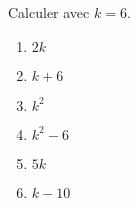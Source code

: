 
\begin{exercice}\label{exosmath-0979}

    Calculer avec \( k=6\).
    \begin{multicols}{3}
    \begin{enumerate}
        \item
            \( 2k\)
        \item
            \( k+6\)
        \item
            \( k^2\)
        \item
            \( k^2-6\)
        \item
            \( 5k\)
        \item
            \( k-10\)
    \end{enumerate}
    \end{multicols}

\end{exercice}
